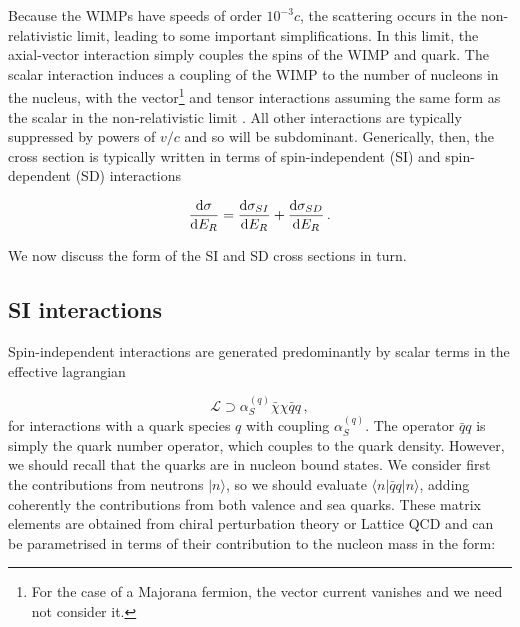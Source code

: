 Because the WIMPs have speeds of order $10^{-3} c$, the scattering occurs in the non-relativistic limit, leading to some important simplifications. In this limit, the axial-vector interaction simply couples the spins of the WIMP and quark. The scalar interaction induces a coupling of the WIMP to the number of nucleons in the nucleus, with the vector\footnote{For the case of a Majorana fermion, the vector current vanishes and we need not consider it.} and tensor interactions assuming the same form as the scalar in the non-relativistic limit \cite{Jungman:1995}. All other interactions are typically suppressed by powers of $v/c$ and so will be subdominant. Generically, then, the cross section is typically written in terms of spin-independent (SI) and spin-dependent (SD) interactions \cite{Goodman:1985} 


\begin{equation}
\frac{\mathrm{d}\sigma}{\mathrm{d}E_R} = \frac{\mathrm{d}\sigma_{SI}}{\mathrm{d}E_R} + \frac{\mathrm{d}\sigma_{SD}}{\mathrm{d}E_R}\,.
\end{equation}

We now discuss the form of the SI and SD cross sections in turn.

\subsection{SI interactions}

Spin-independent interactions are generated predominantly by scalar terms in the effective lagrangian

\begin{equation}
\label{eq:ScalarInt}
\mathcal{L} \supset \alpha_S^{(q)} \bar{\chi} \chi \bar{q} q \,,
\end{equation}
for interactions with a quark species $q$ with coupling $\alpha_S^{(q)}$. The operator $\bar{q} q$ is simply the quark number operator, which couples to the quark density. However, we should recall that the quarks are in nucleon bound states. We consider first the contributions from neutrons $|n\rangle$, so we should evaluate $\langle n|\bar{q}q|n\rangle$, adding coherently the contributions from both valence and sea quarks. These matrix elements are obtained from chiral perturbation theory \cite{Alarcon:2012} or Lattice QCD \cite{Bali:2012} and can be parametrised in terms of their contribution to the nucleon mass in the form:

